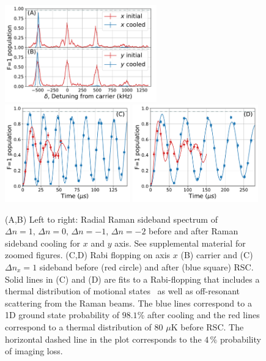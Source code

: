 \documentclass[aps,prl,twocolumn,groupedaddress]{revtex4-1}
\begin{document}
\begin{figure}
  \includegraphics[height=4.2cm]{spectrum_r.pdf}
  \includegraphics[height=4.2cm]{rabi_flop_rx_0.pdf}
  \includegraphics[height=4.2cm]{rabi_flop_rx_p1.pdf}
  \caption{(A,B) Left to right: Radial Raman sideband spectrum of $\Delta n=1,\,\Delta n=0,\,\Delta n=-1,\,\Delta n=-2$ before and after Raman sideband cooling for $x$ and $y$ axis.
    See supplemental material for zoomed figures.
    (C,D) Rabi flopping on axis $x$ (B) carrier and (C) $\Delta n_x=1$ sideband
    before (red circle) and after (blue square) RSC.
    Solid lines in (C) and (D) are fits to a Rabi-flopping
    that includes a thermal distribution of motional states~\cite{Meekhof1996}
    as well as off-resonant scattering from the Raman beams.
    The blue lines correspond to a 1D ground state probability of $98.1$\% after cooling
    and the red lines correspond to a thermal distribution of $80$ $\mu$K before RSC.
    The horizontal dashed line in the plot corresponds to the $4\,\%$ probability
    of imaging loss.
    \label{f-radial}}
\end{figure}
\end{document}
